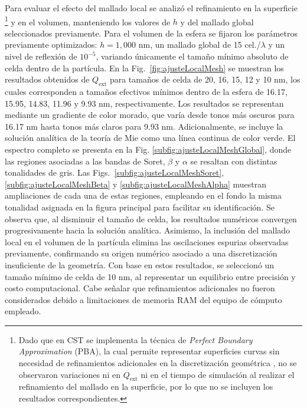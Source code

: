 Para evaluar el efecto del mallado local se analizó el refinamiento en la superficie%
\footnote{Dado que en CST se implementa la técnica de %
	\textit{Perfect Boundary Approximation} (PBA), la cual permite representar superficies curvas sin necesidad de refinamientos adicionales en la discretización geométrica \cite{dassaultsystemesUnderstandingTimeDomain2010}, no se observaron variaciones ni en $Q_{\text{ext}}$ ni en el tiempo de simulación al realizar el refinamiento del mallado en la superficie, por lo que no se incluyen los resultados correspondientes.
}
y en el volumen, manteniendo los valores de \(h\) y del mallado global seleccionados previamente. Para el volumen de la esfera se fijaron los parámetros previamente optimizados: $h=1,000$ nm, un mallado global de 15 cel./$\lambda$ y un nivel de reflexión de $10^{-5}$, variando únicamente el tamaño mínimo absoluto de celda dentro de la partícula. En la Fig.~\ref{fig:ajusteLocalMesh} se muestran los resultados obtenidos de $Q_{\text{ext}}$ para tamaños de celda de 20, 16, 15, 12 y 10 nm, los cuales corresponden a tamaños efectivos mínimos dentro de la esfera de 16.17, 15.95, 14.83, 11.96 y 9.93 nm, respectivamente. Los resultados se representan mediante un gradiente de color morado, que varía desde tonos más oscuros para 16.17 nm hasta tonos más claros para 9.93 nm.  Adicionalmente, se incluye la solución analítica de la teoría de Mie como una línea continua de color verde. El espectro completo se presenta en la Fig. \ref{subfig:ajusteLocalMeshGlobal}, donde las regiones asociadas a las bandas de Soret, $\beta$ y $\alpha$ se resaltan con distintas tonalidades de gris. Las Figs.~\ref{subfig:ajusteLocalMeshSoret}, \ref{subfig:ajusteLocalMeshBeta} y \ref{subfig:ajusteLocalMeshAlpha} muestran ampliaciones de cada una de estas regiones, empleando en el fondo la misma tonalidad asignada en la figura principal para facilitar su identificación. Se observa que, al disminuir el tamaño de celda, los resultados numéricos convergen progresivamente hacia la solución analítica. Asimismo, la inclusión del mallado local en el volumen de la partícula elimina las oscilaciones espurias observadas previamente, confirmando su origen numérico asociado a una discretización insuficiente de la geometría. Con base en estos resultados, se seleccionó un tamaño mínimo de celda de 10 nm, al representar un equilibrio entre precisión y costo computacional. Cabe señalar que refinamientos adicionales no fueron considerados debido a limitaciones de memoria RAM del equipo de cómputo empleado.
%
